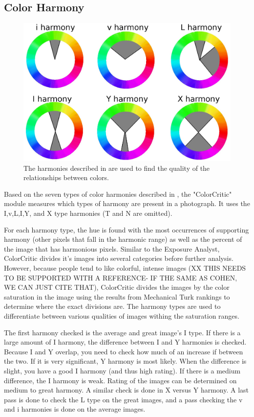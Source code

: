 \documentclass{article}
\begin{document}
\subsection{Color Harmony}   
\begin{figure}
  \centering
    \includegraphics[scale=0.38,clip]{colorharmony.eps}
  \caption{The harmonies described in \cite{COL:COL10004} are used to find the quality of the relationships between colors.}
\end{figure}

Based on the seven types of color harmonies described in \cite{Cohen-Or:2006:CH:1179352.1141933}, the "ColorCritic" module measures which types of harmony are present in a photograph. It uses the I,v,L,I,Y, and X type harmonies (T and N are omitted).

For each harmony type, the hue is found with the most occurrences of supporting harmony (other pixels that fall in the harmonic range) as well as the percent of the image that has harmonious pixels. Similar to the Exposure Analyst, ColorCritic divides it's images into several categories before further analysis. However, because people tend to like colorful, intense images (XX THIS NEEDS TO BE SUPPORTED WITH A REFERENCE- IF THE SAME AS COHEN, WE CAN JUST CITE THAT), ColorCritic divides the images by the color saturation in the image using the results from Mechanical Turk rankings to determine where the exact divisions are. The harmony types are used to differentiate between various qualities of images withing the saturation ranges.

The first harmony checked is the average and great image's I type. If there is a large amount of I harmony, the difference between I and Y harmonies is checked. Because I and Y overlap, you need to check how much of an increase if between the two. If it is very significant, Y harmony is most likely. When the difference is slight, you have a good I harmony (and thus high rating). If there is a medium difference, the I harmony is weak. Rating of the images can be determined on medium to great harmony. A similar check is done in X versus Y harmony. A last pass is done to check the L type on the great images, and a pass checking the v and i harmonies is done on the average images.
\end{document}
